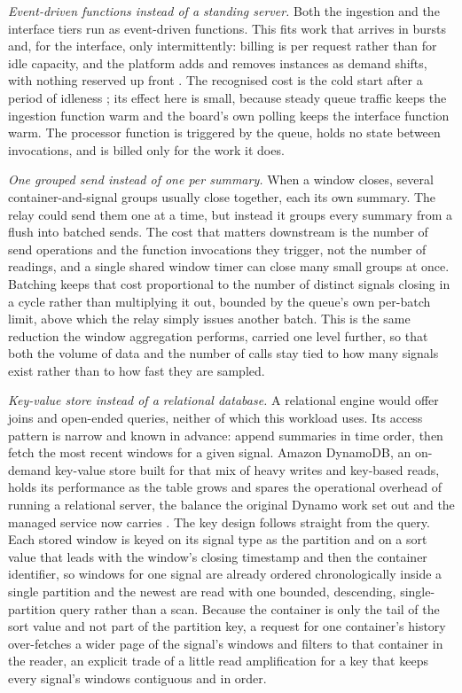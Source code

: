 \documentclass[conference]{IEEEtran}
\begin{document}
\textit{Event-driven functions instead of a standing server.} Both the ingestion and the interface tiers run as event-driven functions. This fits work that arrives in bursts and, for the interface, only intermittently: billing is per request rather than for idle capacity, and the platform adds and removes instances as demand shifts, with nothing reserved up front \cite{armbrust2010}. The recognised cost is the cold start after a period of idleness \cite{wang2018}; its effect here is small, because steady queue traffic keeps the ingestion function warm and the board's own polling keeps the interface function warm. The processor function is triggered by the queue, holds no state between invocations, and is billed only for the work it does.

\textit{One grouped send instead of one per summary.} When a window closes, several container-and-signal groups usually close together, each its own summary. The relay could send them one at a time, but instead it groups every summary from a flush into batched sends. The cost that matters downstream is the number of send operations and the function invocations they trigger, not the number of readings, and a single shared window timer can close many small groups at once. Batching keeps that cost proportional to the number of distinct signals closing in a cycle rather than multiplying it out, bounded by the queue's own per-batch limit, above which the relay simply issues another batch. This is the same reduction the window aggregation performs, carried one level further, so that both the volume of data and the number of calls stay tied to how many signals exist rather than to how fast they are sampled.

\textit{Key-value store instead of a relational database.} A relational engine would offer joins and open-ended queries, neither of which this workload uses. Its access pattern is narrow and known in advance: append summaries in time order, then fetch the most recent windows for a given signal. Amazon DynamoDB, an on-demand key-value store built for that mix of heavy writes and key-based reads, holds its performance as the table grows and spares the operational overhead of running a relational server, the balance the original Dynamo work set out and the managed service now carries \cite{decandia2007, elhemali2022}. The key design follows straight from the query. Each stored window is keyed on its signal type as the partition and on a sort value that leads with the window's closing timestamp and then the container identifier, so windows for one signal are already ordered chronologically inside a single partition and the newest are read with one bounded, descending, single-partition query rather than a scan. Because the container is only the tail of the sort value and not part of the partition key, a request for one container's history over-fetches a wider page of the signal's windows and filters to that container in the reader, an explicit trade of a little read amplification for a key that keeps every signal's windows contiguous and in order.
\end{document}
